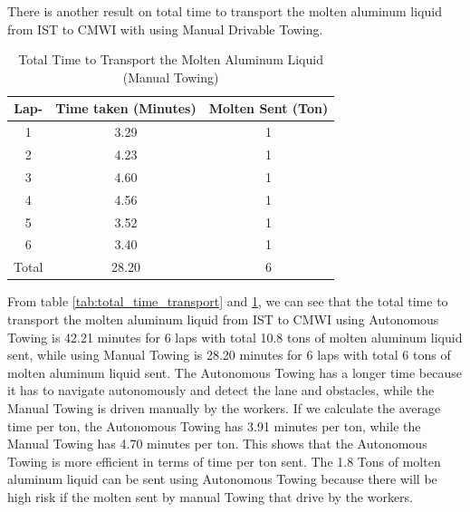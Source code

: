 \documentclass[conference]{IEEEtran}
\begin{document}
There is another result on total time to transport the molten aluminum liquid from IST to CMWI with using Manual Drivable Towing. 

\begin{table}[H]
	\centering
	\caption{Total Time to Transport the Molten Aluminum Liquid (Manual Towing)}
	\label{tab:total_time_transport_manual}
	\begin{tabular}{|c|c|c|}
		\hline
		\textbf{Lap-} & \textbf{Time taken (Minutes)} & \textbf{Molten Sent (Ton)} \\ \hline
		1 & 3.29 & 1 \\ \hline
		2 & 4.23 & 1 \\ \hline
		3 & 4.60 & 1 \\ \hline
		4 & 4.56 & 1 \\ \hline
		5 & 3.52 & 1 \\ \hline
		6 & 3.40 & 1 \\ \hline
		Total & 28.20 & 6 \\ \hline
	\end{tabular}
\end{table} 

From table \ref{tab:total_time_transport} and \ref{tab:total_time_transport_manual}, we can see that the total time to transport the molten aluminum liquid from IST to CMWI using Autonomous Towing is 42.21 minutes for 6 laps with total 10.8 tons of molten aluminum liquid sent, while using Manual Towing is 28.20 minutes for 6 laps with total 6 tons of molten aluminum liquid sent. The Autonomous Towing has a longer time because it has to navigate autonomously and detect the lane and obstacles, while the Manual Towing is driven manually by the workers. If we calculate the average time per ton, the Autonomous Towing has 3.91 minutes per ton, while the Manual Towing has 4.70 minutes per ton. This shows that the Autonomous Towing is more efficient in terms of time per ton sent. The 1.8 Tons of molten aluminum liquid can be sent using Autonomous Towing because there will be high risk if the molten sent by manual Towing that drive by the workers.

\end{document}
